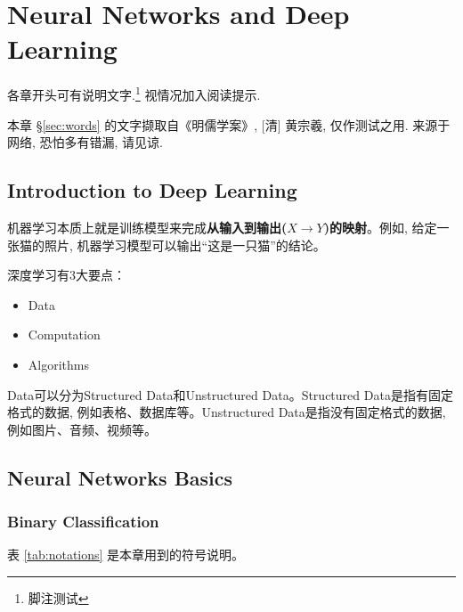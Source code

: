 \chapter{Neural Networks and Deep Learning}
	各章开头可有说明文字.\footnote{脚注测试} 视情况加入阅读提示.
	\begin{wenxintishi}
		本章 \S\ref{sec:words} 的文字撷取自《明儒学案》, [清] 黄宗羲, 仅作测试之用. 来源于网络, 恐怕多有错漏, 请见谅. 
	\end{wenxintishi}

	\section{Introduction to Deep Learning}
	机器学习本质上就是训练模型来完成\textbf{从输入到输出($X\to Y$)的映射}。例如, 给定一张猫的照片, 机器学习模型可以输出``这是一只猫''的结论。

	\vspace{0.5\baselineskip} %

	深度学习有3大要点：
	\begin{itemize}	
		\item Data
		\item Computation
		\item Algorithms
	\end{itemize}

	Data可以分为Structured Data和Unstructured Data。Structured Data是指有固定格式的数据, 例如表格、数据库等。Unstructured Data是指没有固定格式的数据, 例如图片、音频、视频等。

	\section{Neural Networks Basics}
	
	\subsection{Binary Classification}

	表 \ref{tab:notations} 是本章用到的符号说明。

